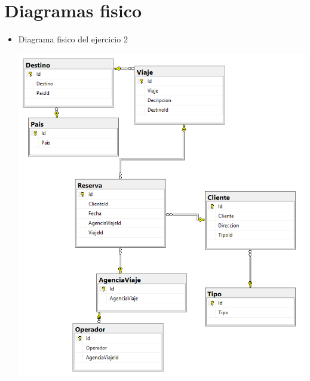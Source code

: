 \section{Diagramas fisico} 

\begin{itemize}
	\item Diagrama fisico del ejercicio 2
	\\
	\begin{center}
	\includegraphics[width=13cm]{./Imagenes/mf_ejer2} 
	\end{center}



\end{itemize} 